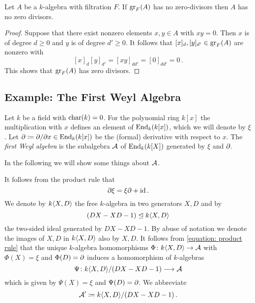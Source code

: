 \begin{lemma}
  \label{lemma: associated graded reflects no zero divisors}
  Let $A$ be a $k$-algebra with filtration $F$.
  If $\operatorname{gr}_F(A)$ has no zero-divisors then $A$ has no zero divisors.
\end{lemma}


\begin{proof}
  Suppose that there exist nonzero elements $x, y \in A$ with $xy = 0$.
  Then $x$ is of degree $d \geq 0$ and $y$ is of degree $d' \geq 0$.
  It follows that $[x]_d, [y]_{d'} \in \operatorname{gr}_F(A)$ are nonzero with
  \[
      [x]_d [y]_{d'}
    = [xy]_{d d'}
    = [0]_{d d'}
    = 0 \,.
  \]
  This shows that $\operatorname{gr}_F(A)$ has zero divisors.
\end{proof}






\subsection{Example: The First Weyl Algebra}
\label{subsection: first weyl algebra}


\begin{fluff}
  Let $k$ be a field with $\operatorname{char}(k) = 0$.
  For the polynomial ring $k[x]$ the multiplication with $x$ defines an element of $\operatorname{End}_k(k[x])$, which we will denote by $\xi$.
  Let $\partial \coloneqq \partial/\partial x \in \operatorname{End}_k(k[x])$ be the (formal) derivative with respect to $x$.
  The \emph{first Weyl algebra} is the subalgebra $\operatorname{\mathcal{A}}$ of $\operatorname{End}_k(k[X])$ generated by $\xi$ and $\partial$.
  
  In the following we will show some things about $\operatorname{\mathcal{A}}$.
\end{fluff}


\begin{fluff}
  It follows from the product rule that
  \begin{equation}
  \label{equation: product rule}
      \partial \xi
    = \xi \partial + {\operatorname{id}} \,.
  \end{equation}
  We denote by $k\!\left\langle X,D \right\rangle$ the free $k$-algebra in two generators $X,D$ and by
  \[
              (DX - XD - 1)
    \trianglelefteq k\!\left\langle X,D \right\rangle
  \]
  the two-sided ideal generated by $DX - XD - 1$.
  By abuse of notation we denote the images of $X, D$ in $k\!\left\langle X,D \right\rangle$ also by $X, D$.
  It follows from \eqref{equation: product rule} that the unique $k$-algebra homomorphisms $\Phi \colon k\!\left\langle X,D \right\rangle \to \operatorname{\mathcal{A}}$ with $\Phi(X) = \xi$ and $\Phi(D) = \partial$ induces a homomorphism of $k$-algebras
  \[
            \Psi
    \colon  k\!\left\langle X,D \right\rangle\!/(DX - XD - 1)
    \longrightarrow \operatorname{\mathcal{A}}
  \]
  which is given by $\Psi(X) = \xi$ and $\Psi(D) = \partial$.
  We abbreviate
  \[
              \operatorname{\mathcal{A}}'
    \coloneqq  k\!\left\langle X,D \right\rangle\!/(DX - XD - 1) \,.
  \]
\end{fluff}


